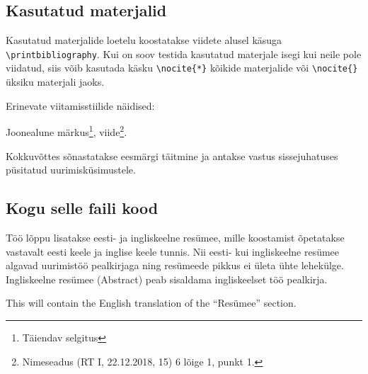 \documentclass{trkut}%
\begin{document}
\section{Kasutatud materjalid}
Kasutatud materjalide loetelu koostatakse viidete alusel käsuga \verb!\printbibliography!. Kui on soov testida kasutatud materjale isegi kui neile pole viidatud, siis võib kasutada käsku \verb!\nocite{*}! kõikide materjalide või \verb!\nocite{}! üksiku materjali jaoks. \parencite[1--5]{palma15}

Erinevate viitamisstiilide näidised: \parencite[333]{test0}

\parencite{test12a} \parencite{test12b}

\parencite{test9}

\parencite[27]{test3}

\parencite{test11}

\parencite{ee1}

\parencite{wiki1}

Joonealune märkus\footnote{Täiendav selgitus}, viide\footnote{Nimeseadus (RT I, 22.12.2018, 15) \textsection{}6 lõige 1, punkt 1.}.


Kokkuvõttes sõnastatakse eesmärgi täitmine ja antakse vastus sissejuhatuses püsitatud uurimisküsimustele.

\nocite{*}
\printbibliography

\begin{appendices}

    \chapter{Kogu selle faili kood}\label{lisa1}
    \tiny
    
    \normalsize

\end{appendices}

Töö lõppu lisatakse eesti- ja ingliskeelne resümee, mille koostamist õpetatakse vastavalt eesti keele ja inglise keele tunnis. Nii eesti- kui ingliskeelne resümee algavad uurimistöö pealkirjaga ning resümeede pikkus ei ületa ühte lehekülge. Ingliskeelne resümee (Abstract) peab sisaldama ingliskeelset töö pealkirja.

This will contain the English translation of the \enquote{Resümee} section.

\kinnitusleht
\end{document}
